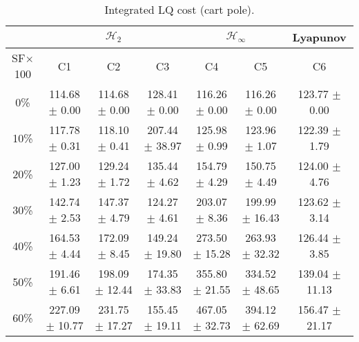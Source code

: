 \begin{table}[H]
\centering
\scriptsize
\begin{tabular}{| c || c | c | c | c | c | c |}
	\hline
	 & \multicolumn{3}{c|}{$\mathcal{H}_{2}$} & \multicolumn{2}{c|}{$\mathcal{H}_{\infty}$} & Lyapunov\\
	\hline
	SF$\times$100 & C1& C2 & C3 & C4 & C5 & C6\\
	\hline\hline
	0\% & 114.68 $\pm$ 0.00 & 114.68 $\pm$ 0.00 & 128.41 $\pm$ 0.00 & 116.26 $\pm$ 0.00 & 116.26 $\pm$ 0.00 & 123.77 $\pm$ 0.00\\
	\hline
	10\% & 117.78 $\pm$ 0.31 & 118.10 $\pm$ 0.41 & 207.44 $\pm$ 38.97 & 125.98 $\pm$ 0.99 & 123.96 $\pm$ 1.07 & 122.39 $\pm$ 1.79\\
	\hline
	20\% & 127.00 $\pm$ 1.23 & 129.24 $\pm$ 1.72 & 135.44 $\pm$ 4.62 & 154.79 $\pm$ 4.29 & 150.75 $\pm$ 4.49 & 124.00 $\pm$ 4.76\\
	\hline
	30\% & 142.74 $\pm$ 2.53 & 147.37 $\pm$ 4.79 & 124.27 $\pm$ 4.61 & 203.07 $\pm$ 8.36 & 199.99 $\pm$ 16.43 & 123.62 $\pm$ 3.14\\
	\hline
	40\% & 164.53 $\pm$ 4.44 & 172.09 $\pm$ 8.45 & 149.24 $\pm$ 19.80 & 273.50 $\pm$ 15.28 & 263.93 $\pm$ 32.32 & 126.44 $\pm$ 3.85\\
	\hline
	50\% & 191.46 $\pm$ 6.61 & 198.09 $\pm$ 12.44 & 174.35 $\pm$ 33.83 & 355.80 $\pm$ 21.55 & 334.52 $\pm$ 48.65 & 139.04 $\pm$ 11.13\\
	\hline
	60\% & 227.09 $\pm$ 10.77 & 231.75 $\pm$ 17.27 & 155.45 $\pm$ 19.11 & 467.05 $\pm$ 32.73 & 394.12 $\pm$ 62.69 & 156.47 $\pm$ 21.17\\
	\hline
\end{tabular}
\caption{Integrated LQ cost (cart pole).}
\label{table:lq_cost_cart_pole:noise}
\end{table}

